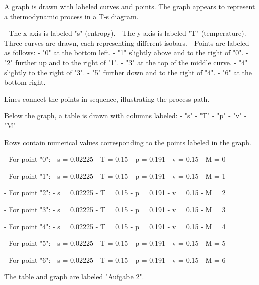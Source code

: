 A graph is drawn with labeled curves and points. The graph appears to represent a thermodynamic process in a T-s diagram.  

- The x-axis is labeled "s" (entropy).  
- The y-axis is labeled "T" (temperature).  
- Three curves are drawn, each representing different isobars.  
- Points are labeled as follows:  
  - "0" at the bottom left.  
  - "1" slightly above and to the right of "0".  
  - "2" further up and to the right of "1".  
  - "3" at the top of the middle curve.  
  - "4" slightly to the right of "3".  
  - "5" further down and to the right of "4".  
  - "6" at the bottom right.  

Lines connect the points in sequence, illustrating the process path.  

Below the graph, a table is drawn with columns labeled:  
- "s"  
- "T"  
- "p"  
- "v"  
- "M"  

Rows contain numerical values corresponding to the points labeled in the graph.  

- For point "0":  
  - s = 0.02225  
  - T = 0.15  
  - p = 0.191  
  - v = 0.15  
  - M = 0  

- For point "1":  
  - s = 0.02225  
  - T = 0.15  
  - p = 0.191  
  - v = 0.15  
  - M = 1  

- For point "2":  
  - s = 0.02225  
  - T = 0.15  
  - p = 0.191  
  - v = 0.15  
  - M = 2  

- For point "3":  
  - s = 0.02225  
  - T = 0.15  
  - p = 0.191  
  - v = 0.15  
  - M = 3  

- For point "4":  
  - s = 0.02225  
  - T = 0.15  
  - p = 0.191  
  - v = 0.15  
  - M = 4  

- For point "5":  
  - s = 0.02225  
  - T = 0.15  
  - p = 0.191  
  - v = 0.15  
  - M = 5  

- For point "6":  
  - s = 0.02225  
  - T = 0.15  
  - p = 0.191  
  - v = 0.15  
  - M = 6  

The table and graph are labeled "Aufgabe 2".